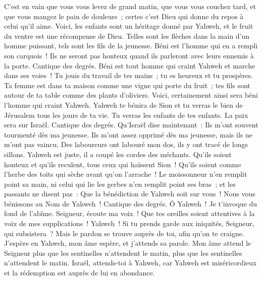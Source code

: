 \begin{multicols}{2}
C'est en vain que vous vous levez de grand matin, que vous vous couchez tard, et que vous mangez le pain de douleurs~; certes c'est Dieu qui donne du repos à celui qu'il aime.
Voici, les enfants sont un héritage donné par Yahweh, et le fruit du ventre est une récompense de Dieu.
Telles sont les flèches dans la main d'un homme puissant, tels sont les fils de la jeunesse.
Béni est l'homme qui en a rempli son carquois~! Ils ne seront pas honteux quand ils parleront avec leurs ennemis à la porte.
\VerseOne{}Cantique des degrés. Béni est tout homme qui craint Yahweh et marche dans ses voies~!
Tu jouis du travail de tes mains~; tu es heureux et tu prospères.
Ta femme est dans ta maison comme une vigne qui porte du fruit~; tes fils sont autour de ta table comme des plants d'oliviers.
Voici, certainement ainsi sera béni l'homme qui craint Yahweh.
Yahweh te bénira de Sion et tu verras le bien de Jérusalem tous les jours de ta vie.
Tu verras les enfants de tes enfants. La paix sera sur Israël.
\VerseOne{}Cantique des degrés. Qu'Israël dise maintenant~: Ils m'ont souvent tourmenté dès ma jeunesse.
Ils m'ont assez opprimé dès ma jeunesse, mais ils ne m'ont pas vaincu.
Des laboureurs ont labouré mon dos, ils y ont tracé de longs sillons.
Yahweh est juste, il a coupé les cordes des méchants.
Qu'ils soient honteux et qu'ils reculent, tous ceux qui haïssent Sion~!
Qu'ils soient comme l'herbe des toits qui sèche avant qu'on l'arrache~!
Le moissonneur n'en remplit point sa main, ni celui qui lie les gerbes n'en remplit point ses bras~;
et les passants ne disent pas~: Que la bénédiction de Yahweh soit sur vous~! Nous vous bénissons au Nom de Yahweh~!
\VerseOne{}Cantique des degrés. Ô Yahweh~! Je t'invoque du fond de l'abîme.
Seigneur, écoute ma voix~! Que tes oreilles soient attentives à la voix de mes supplications~!
Yahweh~! Si tu prends garde aux iniquités, Seigneur, qui subsistera~?
Mais le pardon se trouve auprès de toi, afin qu'on te craigne.
J'espère en Yahweh, mon âme espère, et j'attends sa parole.
Mon âme attend le Seigneur plus que les sentinelles n'attendent le matin, plus que les sentinelles n'attendent le matin.
Israël, attends-toi à Yahweh, car Yahweh est miséricordieux et la rédemption est auprès de lui en abondance.

\end{multicols}
